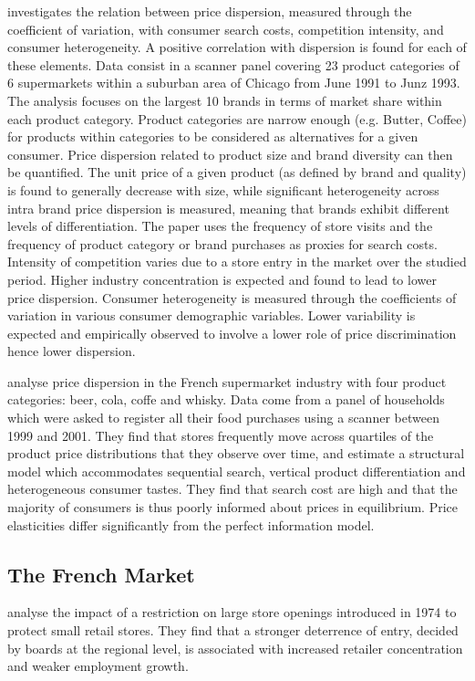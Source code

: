 \documentclass[english]{article}
\begin{document}
\cite{ZHA06} investigates the relation between price dispersion, measured through the coefficient of variation, with consumer search costs, competition intensity, and consumer heterogeneity. A positive correlation with dispersion is found for each of these elements. Data consist in a scanner panel covering 23 product categories of 6 supermarkets within a suburban area of Chicago from June 1991 to Junz 1993. The analysis focuses on the largest 10 brands in terms of market share within each product category. Product categories are narrow enough (e.g. Butter, Coffee) for products within categories to be considered as alternatives for a given consumer. Price dispersion related to product size and brand diversity can then be quantified. The unit price of a given product (as defined by brand and quality) is found to generally decrease with size, while significant heterogeneity across intra brand price dispersion is measured, meaning that brands exhibit different levels of differentiation. The paper uses the frequency of store visits and the frequency of product category or brand purchases as proxies for search costs. Intensity of competition varies due to a store entry in the market over the studied period. Higher industry concentration is expected and found to lead to lower price dispersion. Consumer heterogeneity is measured through the coefficients of variation in various consumer demographic variables. Lower variability is expected and empirically observed to involve a lower role of price discrimination hence lower dispersion.

\cite{PER15} analyse price dispersion in the French supermarket industry with four product categories: beer, cola, coffe and whisky. Data come from a panel of households which were asked to register all their food purchases using a scanner between 1999 and 2001. They find that stores frequently move across quartiles of the product price distributions that they observe over time, and estimate a structural model which accommodates sequential search, vertical product differentiation and heterogeneous consumer tastes. They find that search cost are high and that the majority of consumers is thus poorly informed about prices in equilibrium. Price elasticities differ significantly from the perfect information model.

\subsection{The French Market}

\cite{BER02} analyse the impact of a restriction on large store openings introduced in 1974 to protect small retail stores. They find that a stronger deterrence of entry, decided by boards at the regional level, is associated with increased retailer concentration and weaker employment growth.
\end{document}
